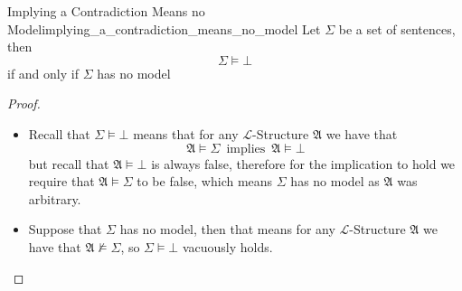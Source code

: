 \begin{proposition}
{Implying a Contradiction Means no Model}{implying_a_contradiction_means_no_model}
Let \(\Sigma \) be a set of sentences, then
\[
\Sigma \models \bot
\]
if and only if \(\Sigma \) has no model
\end{proposition}
\begin{proof}
    \begin{itemize}
        \item Recall that \(\Sigma \models \bot \) means that for any
            \(\mathcal{L}\)-Structure \(\mathfrak{A} \) we have that
            \[
            \mathfrak{A} \models \Sigma \enspace \text{implies} \enspace
            \mathfrak{A} \models \bot
            \]
            but recall that \(\mathfrak{A} \models \bot \) is always false,
            therefore for the implication to hold we require that \(\mathfrak{A}
            \models \Sigma \) to be false, which means \(\Sigma \) has no model
            as \(\mathfrak{A} \) was arbitrary.
        \item Suppose that \(\Sigma \) has no model, then that means for any
        \(\mathcal{L}\)-Structure \(\mathfrak{A} \) we have that \(\mathfrak{A}
        \not \models \Sigma \), so \( \Sigma \models \bot  \) vacuously holds.
    \end{itemize}
\end{proof}

